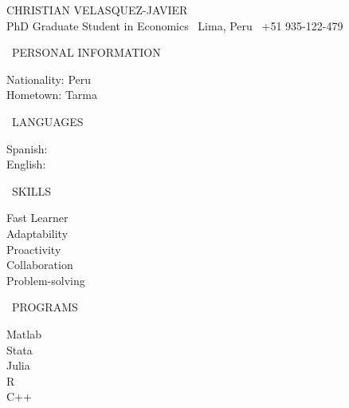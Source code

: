 \documentclass[11pt, a4paper]{article}
\begin{document}
	\begin{center}
		\huge{CHRISTIAN VELASQUEZ-JAVIER}\\ \vskip5pt
		\small{PhD Graduate Student in Economics \quad \faMapMarker \, Lima, Peru \quad \faMobilePhone \, +51 935-122-479}
	\end{center}
\vspace{0.5cm}
\begin{minipage}[l]{0.19\linewidth}
\vspace{-5.5cm}
\footnotesize 
\begin{center} \faChild \, PERSONAL INFORMATION \faChild \end{center}
\vspace{-10pt}
	Nationality: Peru\\
	Hometown: Tarma\\
\begin{center}\faGlobe\, LANGUAGES \faGlobe \end{center}
\vspace{-10pt}
Spanish: \faStar\faStar\faStar\faStar\faStar  \\
English: \faStar\faStar\faStar\faStar\faStarHalfEmpty \\
\begin{center} \faThumbsUp  \, SKILLS  \faThumbsUp \end{center}
\vspace{-10pt}
\centering Fast Learner \\  Adaptability \\ Proactivity \\ Collaboration \\ Problem-solving \\
\begin{center} \faCode\, PROGRAMS \faCode \end{center}
\vspace{-10pt}
\centering Matlab  \faStar\faStar\faStar\faStar\faStar \\ 
		   Stata  \hspace{2mm} \faStar\faStar\faStar\faStar\faStar \\ 
		   Julia  \hspace{2mm} \faStar\faStar\faStar\faStar\faStarHalfEmpty \\ 
		   R 	  \hspace{6mm} \faStar\faStar\faStar\faStar\faStarO \\
		   C++    \hspace{1mm} \faStar\faStar\faStar\faStar\faStarO \\ 
\end{minipage}
\end{document}
